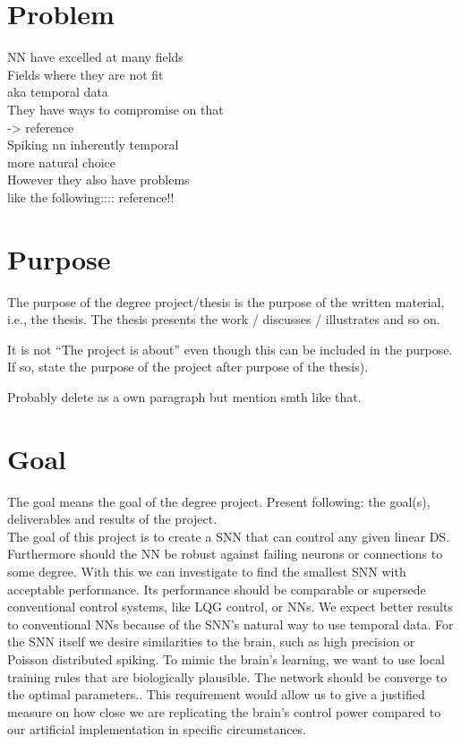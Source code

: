 \section{Problem}
NN have excelled at many fields\\
Fields where they are not fit\\ aka temporal data\\
They have ways to compromise on that \\ -> reference\\
Spiking nn inherently temporal \\
more natural choice\\
However they also have problems\\
like the following:::: reference!!\\
\section{Purpose}
The purpose of the degree project/thesis is the purpose of the written material, i.e., the thesis. The thesis presents the work / discusses / illustrates and so on.

It is not “The project is about” even though this can be included in the purpose. If so, state the purpose of the project after purpose of the thesis).

Probably delete as a own paragraph but mention smth like that.

\section{Goal}
The goal means the goal of the degree project. Present following: the goal(s), deliverables and results of the project.\\

The goal of this project is to create a \ac{SNN} that can control  any given linear \ac{DS}. Furthermore should the \ac{NN} be robust against failing neurons or connections to some degree. With this we can investigate to find the smallest \ac{SNN} with acceptable performance.
Its performance should be comparable or supersede conventional control systems, like \ac{LQG} control, or \acp{NN}. We expect better results to conventional \acp{NN} because of the \ac{SNN}'s natural way to use temporal data. For the \ac{SNN} itself we desire similarities to the brain, such as high precision or Poisson distributed spiking.
To mimic the brain's learning, we want to use local training rules that are biologically plausible. The network should be converge to the optimal parameters.. This requirement would allow us to give a justified measure on how close we are replicating the brain's control power compared to our artificial implementation in specific circumstances.

